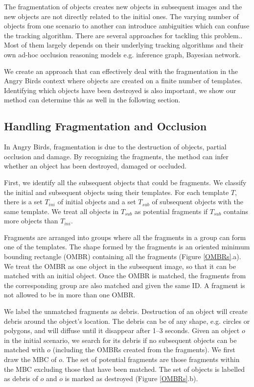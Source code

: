 \documentclass[letterpaper]{article}
\begin{document}
The fragmentation of objects creates new objects in subsequent images and the new objects are not directly related to the initial ones. The varying number of objects from one scenario to another can introduce ambiguities which can confuse the tracking algorithm. There are several approaches for tackling this problem.\cite{Occlusion1,Occlusion2,Occlusion3}. Most of them largely depends on their underlying tracking algorithms and their own ad-hoc occlusion reasoning models e.g. inference graph, Bayesian network. 

We create an approach that can effectively deal with the fragmentation in the Angry Birds context where objects are created on a finite number of templates. 
Identifying which objects have been destroyed is also important, we show our method can determine this as well in the following section.   

\subsection{Handling Fragmentation and Occlusion}
 
In Angry Birds, fragmentation is due to the destruction of objects, partial occlusion and damage. By recognizing the fragments, the method can infer whether an object has been destroyed, damaged or occluded.

First, we identify all the subsequent objects that could be fragments. We classify the initial and subsequent objects using their templates. For each template $T$, there is a set $T_{ini}$ of initial objects and a set $T_{sub}$ of subsequent objects with the same template. We treat all objects in $T_{sub}$ as potential fragments if $T_{sub}$ contains more objects than $T_{ini}$.

Fragments are arranged into groups where all the fragments in a group can form one of the templates. The shape formed by the fragments is an oriented minimum bounding rectangle (OMBR) containing all the fragments (Figure \ref{OMBRs}.a). We treat the OMBR as one object in the subsequent image, so that it can be matched with an initial object. Once the OMBR is matched, the fragments from the corresponding group are also matched and given the same ID. A fragment is not allowed to be in more than one OMBR.

We label the unmatched fragments as debris. Destruction of an object will create debris around the object's location. The debris can be of any shape, e.g. circles or polygons, and will diffuse until it disappear after 1--3 seconds. Given an object $o$ in the initial scenario, we search for its debris if no subsequent objects can be matched with $o$ (including the OMBRs created from the fragments). We first draw the MBC of $o$. The set of potential fragments are those fragments within the MBC excluding those that have been matched. The set of objects is labelled as debris of $o$ and $o$ is marked as destroyed (Figure \ref{OMBRs}.b).
\end{document}
